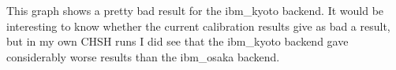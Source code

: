 \documentclass[12pt]{extarticle}
\begin{document}
This graph shows a pretty bad result for the ibm\_kyoto backend.
It would be interesting to know whether the current calibration results give as bad a result,
but in my own CHSH runs I did see that the ibm\_kyoto backend gave considerably worse results than the ibm\_osaka backend.

\end{document}
